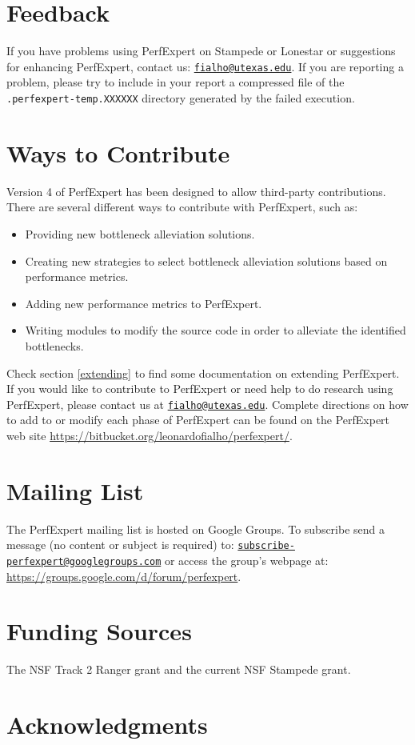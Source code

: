 \section{Feedback}

If you have problems using PerfExpert on Stampede or Lonestar or suggestions for enhancing PerfExpert, contact us: \href{mailto:fialho@utexas.edu}{\texttt{fialho@utexas.edu}}. If you are reporting a problem, please try to include in your report a compressed file of the \texttt{.perfexpert-temp.XXXXXX} directory generated by the failed execution.

\section{Ways to Contribute}

Version 4 of PerfExpert has been designed to allow third-party contributions. There are several different ways to contribute with PerfExpert, such as:

\begin{itemize}
	\item Providing new bottleneck alleviation solutions.
	\item Creating new strategies to select bottleneck alleviation solutions based on performance metrics.
	\item Adding new performance metrics to PerfExpert.
	\item Writing modules to modify the source code in order to alleviate the identified bottlenecks.
\end{itemize}

Check section \ref{extending} to find some documentation on extending PerfExpert. If you would like to contribute to PerfExpert or need help to do research using PerfExpert, please contact us at \href{mailto:fialho@utexas.edu}{\texttt{fialho@utexas.edu}}. Complete directions on how to add to or modify each phase of PerfExpert can be found on the PerfExpert web site \url{https://bitbucket.org/leonardofialho/perfexpert/}.

\section{Mailing List}

The PerfExpert mailing list is hosted on Google Groups. To subscribe send a message (no content or subject is required) to:
\href{mailto:subscribe-perfexpert@googlegroups.com}{\texttt{subscribe-perfexpert@googlegroups.com}} or access the group's webpage at: \url{https://groups.google.com/d/forum/perfexpert}.

\section{Funding Sources}

The NSF Track 2 Ranger grant and the current NSF Stampede grant.

\section{Acknowledgments}
